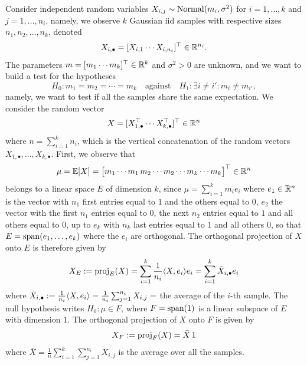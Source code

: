 Consider independent random variables $X_{i, j} \sim \operatorname{Normal}(m_i, \sigma^2)$ for $i=1, \ldots, k$ and $j=1, \ldots, n_i$, namely, we observe $k$ Gaussian iid samples with respective sizes $n_1, n_2,\dots, n_k$, denoted
\begin{equation*}
	X_{i, \bullet} = [X_{i, 1} \cdots X_{i, n_i}]^\top \in \mathbb R^{n_i}.
\end{equation*}
The parameters $m = [m_1 \cdots m_k]^\top \in \mathbb R^k$ and $\sigma^2 > 0$ are unknown, and we want to build a test for the hypotheses
\begin{equation*}
  H_0 : m_1 = m_2 = \cdots = m_k  \quad \text{against} \quad H_1 : \exists i \neq i': m_i \neq m_{i'},
\end{equation*}
namely, we want to test if all the samples share the same expectation.
We consider the random vector
\begin{equation*}
	X = [X_{1, \bullet}^\top \cdots X_{k, \bullet}^\top]^\top \in \mathbb R^n
\end{equation*}
where $n = \sum_{i=1}^k n_i$, which is the vertical concatenation of the random vectors $X_{1, \bullet}, \ldots, X_{k, \bullet}$.
First, we observe that 
\begin{equation*}
 \mu = \mathbb E [X] = 
 \begin{bmatrix}
  m_1 \cdots m_1 \, m_2 \cdots m_2 \cdots m_k \cdots m_k
 \end{bmatrix}^\top \in \mathbb R^n
\end{equation*}
belongs to a linear space $E$ of dimension $k$, since $\mu = \sum_{i=1}^k m_i e_i$ where $e_1 \in \mathbb R^n$ is the vector with $n_1$ first entries equal to $1$ and the others equal to $0$, $e_2$ the vector with the first $n_1$ entries equal to 0, the next $n_2$ entries equal to $1$ and all others equal to $0$, up to $e_k$ with $n_k$ last entries equal to $1$ and all others $0$, so that $E = \operatorname*{span}(e_1, \ldots, e_k)$ where the $e_i$ are orthogonal.
The orthogonal projection of $X$ onto $E$ is therefore given by
\begin{equation*}
	X_E := \operatorname{proj}_E(X) = \sum_{i=1}^k \frac{1}{n_i} \langle X, e_i \rangle e_i = \sum_{i=1}^k \bar X_{i, \bullet} e_i
\end{equation*}
where $\bar X_{i, \bullet} := \frac{1}{n_i} \langle X, e_i \rangle = \frac{1}{n_i} \sum_{j=1}^{n_i} X_{i, j}=$ the average of the $i$-th sample.
The null hypothesis writes $H_0:  \mu \in F$, where $F = \operatorname*{span}(\operatorname{\boldsymbol 1})$ is a linear subspace of $E$ with dimension $1$.
The orthogonal projection of $X$ onto $F$ is given by
\begin{equation*}
	X_F := \operatorname{proj}_F(X) = \bar X \operatorname{\boldsymbol 1}
\end{equation*}
where $\bar X = \frac 1n \sum_{i=1}^k \sum_{j=1}^{n_i} X_{i, j}$ is the average over all the samples.

